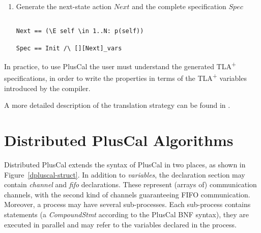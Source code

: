 \documentclass{article}
\newcommand{\tlaplus}{TLA\textsuperscript{+}\xspace}
\begin{document}
\begin{enumerate}
\begin{lstlisting}[language=pluscal, frame = tlrb, numbers=none]
enter(self) == /\ pc[self] = "enter"
               /\ (sem > 0)
               /\ sem' = sem - 1
               /\ pc' = [pc <@\textcolor{violet}{EXCEPT}@> ![self] = "cs" ]
\end{lstlisting}

Moreover, the PlusCal translator generates an action that corresponds to the disjunction of the actions for the individual labels and that represents the transition relation of a process.

\begin{lstlisting}[language=pluscal, frame = tlrb, numbers=none]
p(self) == start(self) \/ enter(self) \/ cs(self) \/ exit(self)
\end{lstlisting}

\item Generate the next-state action $Next$ and the complete specification $Spec$

\begin{lstlisting}[language=pluscal, frame = tlrb, numbers=none]

Next == (\E self \in 1..N: p(self))

Spec == Init /\ [][Next]_vars

\end{lstlisting}

\end{enumerate}

In practice, to use PlusCal the user must understand the generated \tlaplus specifications, in order to write the properties in terms of the \tlaplus variables introduced by the compiler.

A more detailed description of the translation strategy can be found in \cite{pcalAlgo}.

\FloatBarrier
\section{Distributed PlusCal Algorithms}

Distributed PlusCal extends the syntax of PlusCal in two places, as shown in Figure~\ref{dpluscal-struct}. In addition to \emph{variables}, the declaration section may contain \emph{channel} and \emph{fifo} declarations. These represent (arrays of) communication channels, with the second kind of channels guaranteeing FIFO communication. Moreover, a process may have several sub-processes. Each sub-process contains statements (a \emph{CompoundStmt} according to the PlusCal BNF syntax), they are executed in parallel and may refer to the variables declared in the process.
\end{document}
